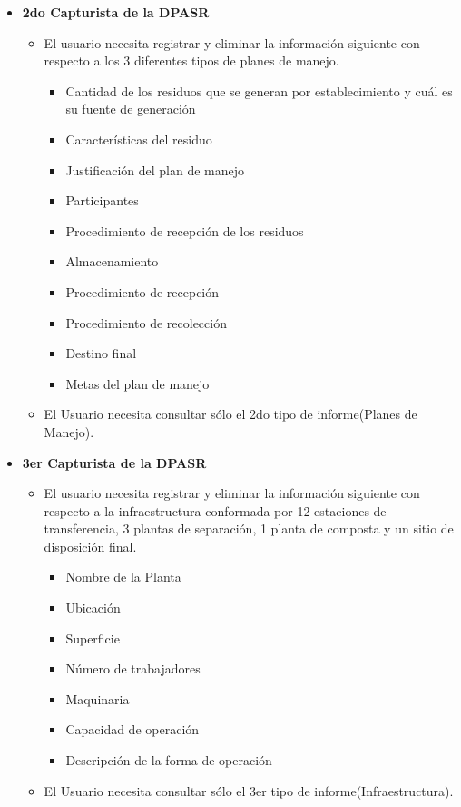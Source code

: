 \begin{itemize}
	\item \textbf{2do Capturista de la DPASR}
	\begin{itemize}
		\item El usuario necesita registrar y eliminar la información siguiente con respecto a los 3 diferentes tipos de planes de manejo.
		\begin{itemize}
			\item Cantidad de los residuos que se generan  por establecimiento y cuál es su fuente de generación
			\item Características del residuo
			\item Justificación del plan de manejo        
			\item Participantes
			\item Procedimiento de recepción  de los residuos
			\item Almacenamiento
			\item Procedimiento de recepción    
			\item Procedimiento de  recolección
			\item Destino final
			\item Metas del plan de manejo
		\end{itemize}
		\item El Usuario necesita consultar sólo el 2do tipo de informe(Planes de Manejo).
	\end{itemize}
	\item \textbf{3er Capturista de la DPASR}
	\begin{itemize}
		\item El usuario necesita registrar y eliminar la información siguiente con respecto a la infraestructura conformada por 12 estaciones de transferencia, 3 plantas de separación, 1 planta de composta y un sitio de disposición final.
		\begin{itemize}
			\item Nombre de la Planta
			\item Ubicación
			\item Superficie 
			\item Número de trabajadores
			\item Maquinaria
			\item Capacidad de operación 
			\item Descripción de la forma de operación
		\end{itemize}
		\item El Usuario necesita consultar sólo el 3er tipo de informe(Infraestructura).
	\end{itemize}

\end{itemize}
